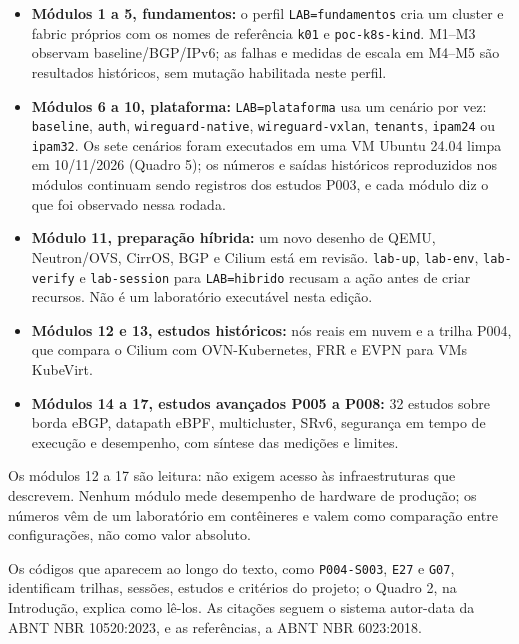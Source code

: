 \documentclass[12pt,openany,oneside,a4paper,chapter=TITLE,english,brazil]{abntex2}
\providecommand{\tightlist}{\setlength{\itemsep}{0pt}\setlength{\parskip}{0pt}}
\begin{document}
\begin{itemize}
\tightlist
\item
  \textbf{Módulos 1 a 5, fundamentos:} o perfil \texttt{LAB=\allowbreak{}fundamentos} cria um cluster e fabric próprios com os nomes de referência \texttt{k01} e \texttt{poc-{}\allowbreak{}k8s-{}\allowbreak{}kind}. M1--M3 observam baseline/BGP/IPv6; as falhas e medidas de escala em M4--M5 são resultados históricos, sem mutação habilitada neste perfil.
\item
  \textbf{Módulos 6 a 10, plataforma:} \texttt{LAB=\allowbreak{}plataforma} usa um cenário por vez: \texttt{baseline}, \texttt{auth}, \texttt{wireguard-{}\allowbreak{}native}, \texttt{wireguard-{}\allowbreak{}vxlan}, \texttt{tenants}, \texttt{ipam24} ou \texttt{ipam32}. Os sete cenários foram executados em uma VM Ubuntu 24.04 limpa em 10/11/2026 (Quadro 5); os números e saídas históricos reproduzidos nos módulos continuam sendo registros dos estudos P003, e cada módulo diz o que foi observado nessa rodada.
\item
  \textbf{Módulo 11, preparação híbrida:} um novo desenho de QEMU, Neutron/OVS, CirrOS, BGP e Cilium está em revisão. \texttt{lab-{}\allowbreak{}up}, \texttt{lab-{}\allowbreak{}env}, \texttt{lab-{}\allowbreak{}verify} e \texttt{lab-{}\allowbreak{}session} para \texttt{LAB=\allowbreak{}hibrido} recusam a ação antes de criar recursos. Não é um laboratório executável nesta edição.
\item
  \textbf{Módulos 12 e 13, estudos históricos:} nós reais em nuvem e a trilha P004, que compara o Cilium com OVN-Kubernetes, FRR e EVPN para VMs KubeVirt.
\item
  \textbf{Módulos 14 a 17, estudos avançados P005 a P008:} 32 estudos sobre borda eBGP, datapath eBPF, multicluster, SRv6, segurança em tempo de execução e desempenho, com síntese das medições e limites.
\end{itemize}

Os módulos 12 a 17 são leitura: não exigem acesso às infraestruturas que
descrevem. Nenhum módulo mede desempenho de hardware de produção; os números
vêm de um laboratório em contêineres e valem como comparação entre
configurações, não como valor absoluto.

Os códigos que aparecem ao longo do texto, como \texttt{P004-{}\allowbreak{}S003}, \texttt{E27} e \texttt{G07},
identificam trilhas, sessões, estudos e critérios do projeto; o Quadro 2, na
Introdução, explica como lê-los. As citações seguem o sistema autor-data da
ABNT NBR 10520:2023, e as referências, a ABNT NBR 6023:2018.
\end{document}
